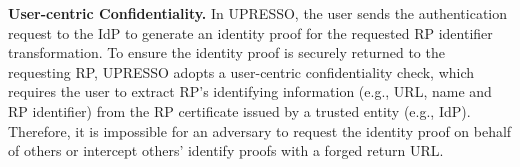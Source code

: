 
\vspace{1mm}\noindent \textbf{User-centric Confidentiality.}
In UPRESSO, the user sends the authentication request to the IdP to generate an identity proof for the requested RP identifier transformation. To ensure the identity proof is securely returned to the requesting RP, UPRESSO adopts a user-centric confidentiality check, which requires the user to extract RP's identifying information (e.g., URL, name and RP identifier) from the RP certificate issued by a trusted entity (e.g., IdP). Therefore, it is impossible for an adversary to request the identity proof on behalf of others or intercept others' identify proofs with a forged return URL.

\begin{comment}
Instead of relying on the check at the IdP, the confidentiality is ensured by a user-side check based on the trusted information extracted from the RP certificate.
In UPRESSO, a certificate is issued for each RP by a trusted entity (e.g., IdP) to protect the identifying information of the RP (e.g., URL, name and RP identifier) with a signature from the trusted entity to avoid the modification and forging.
The user transmits IdP the request with the correct RP identifier  transformation for generating identity proof; and sends the proof to the URL specified in the RP certificate.
\end{comment}


